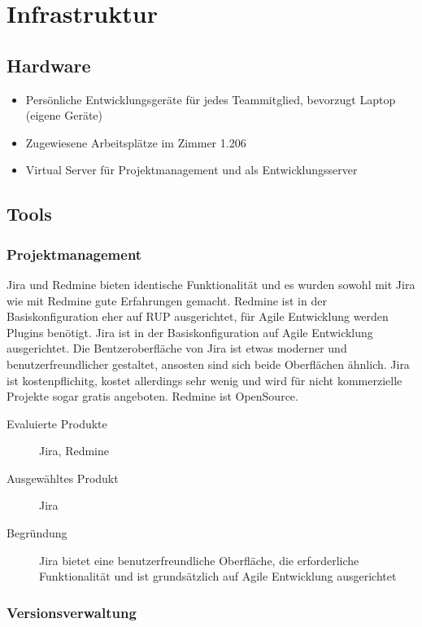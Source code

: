 \chapter{Infrastruktur}
	\section{Hardware}
		\begin{itemize}
			\setlength{\itemsep}{-\parsep}
			\item Persönliche Entwicklungsgeräte für jedes Teammitglied, bevorzugt Laptop (eigene Geräte)
			\item Zugewiesene Arbeitsplätze im Zimmer 1.206
			\item Virtual Server für Projektmanagement und als Entwicklungsserver
		\end{itemize}

		
	\section{Tools}
		\subsection{Projektmanagement}	
			Jira und Redmine bieten identische Funktionalität und es wurden sowohl mit Jira wie mit Redmine gute Erfahrungen gemacht. 
			Redmine ist in der Basiskonfiguration eher auf RUP ausgerichtet, für Agile Entwicklung werden Plugins benötigt. 
			Jira ist in der Basiskonfiguration auf Agile Entwicklung ausgerichtet. 
			Die Bentzeroberfläche von Jira ist etwas moderner und benutzerfreundlicher gestaltet, ansosten sind sich beide Oberflächen ähnlich. 
			Jira ist kostenpflichitg, kostet allerdings sehr wenig und wird für nicht kommerzielle Projekte sogar gratis angeboten.
			Redmine ist OpenSource.
		
			\begin{description}
				\item[Evaluierte Produkte] Jira, Redmine
				\item[Ausgewähltes Produkt] Jira
				\item[Begründung] Jira bietet eine benutzerfreundliche Oberfläche, die erforderliche Funktionalität und ist grundsätzlich auf Agile Entwicklung ausgerichtet
			\end{description}


		\subsection{Versionsverwaltung}
